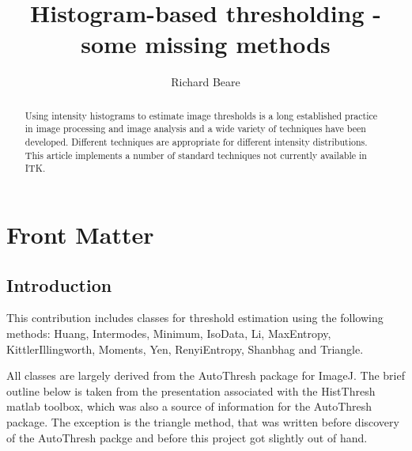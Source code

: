 \documentclass{InsightArticle}
\title{Histogram-based thresholding - some missing methods}
\author{Richard Beare}
\newcommand{\IJhandlerIDnumber}{}
\begin{document}
%
% 
\IJhandlefooter{\IJhandlerIDnumber}{3279}

\maketitle

\ifhtml
\chapter*{Front Matter\label{front}}
\fi


\begin{abstract}
\noindent
Using intensity histograms to estimate image thresholds is a long
established practice in image processing and image analysis and a wide
variety of techniques have been developed. Different techniques are
appropriate for different intensity distributions. This article
implements a number of standard techniques not currently available in
ITK.
\end{abstract}

\IJhandlenote{\IJhandlerIDnumber}

\tableofcontents

\section{Introduction}
This contribution includes classes for threshold estimation using the
following methods: Huang\cite{huang1995image},
Intermodes\cite{prewitt1965analysis},
Minimum\cite{prewitt1965analysis}, IsoData\cite{ridler1978picture},
Li\cite{li1993minimum,li1998iterative}, MaxEntropy\cite{kapur1985new},
KittlerIllingworth\cite{kittler1986minimum},
Moments\cite{tsai1985moment}, Yen\cite{yen1995new},
RenyiEntropy\cite{kapur1985new},
Shanbhag\cite{shanbhag1994utilization} and
Triangle\cite{zack1977automatic}.

All classes are largely derived from the AutoThresh
\cite{LandiniImageJ} package for ImageJ. The brief outline below is
taken from the presentation associated with the
HistThresh\cite{HistThreshMatlab} matlab toolbox, which was also a
source of information for the AutoThresh package. The exception is the
triangle method, that was written before discovery of the AutoThresh
packge and before this project got slightly out of hand.
\end{document}
